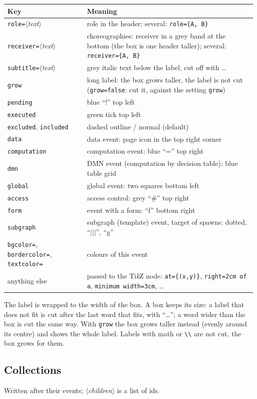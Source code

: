 \documentclass[a4paper,11pt]{article}
\newcommand\cs[1]{\texttt{\textbackslash#1}}
\newcommand\key[1]{\texttt{#1}}
\newcommand\meta[1]{\ensuremath{\langle}\textit{#1}\ensuremath{\rangle}}
\begin{document}
\medskip
\begin{tabularx}{\linewidth}{@{}lL@{}}
\toprule
Key & Meaning\\
\midrule
\key{role=}\meta{text} & role in the header; several: \key{role=\{A, B\}}\\
\key{receiver=}\meta{text} & choreographies: receiver in a grey band at the
  bottom (the box is one header taller); several: \key{receiver=\{A, B\}}\\
\key{subtitle=}\meta{text} & grey italic text below the label, cut off with \dots\\
\key{grow} & long label: the box grows taller, the label is not cut
  (\key{grow=false}: cut it, against the setting \key{grow})\\
\key{pending} & blue ``!'' top left\\
\key{executed} & green tick top left\\
\key{excluded}, \key{included} & dashed outline / normal (default)\\
\key{data} & data event: page icon in the top right corner\\
\key{computation} & computation event: blue ``='' top right\\
\key{dmn} & DMN event (computation by decision table): blue table grid\\
\key{global} & global event: two squares bottom left\\
\key{access} & access control: grey ``\#'' top right\\
\key{form} & event with a form: ``f'' bottom right\\
\key{subgraph} & subgraph (template) event, target of spawns: dotted, ``$|||$'', ``g''\\
\key{bgcolor=}, \key{bordercolor=}, \key{textcolor=} & colours of this event\\
anything else & passed to the Ti\emph{k}Z node: \key{at=\{(x,y)\}},
  \key{right=2cm of a}, \key{minimum width=3cm}, \dots\\
\bottomrule
\end{tabularx}

The label is wrapped to the width of the box. A box keeps its size: a label
that does not fit is cut after the last word that fits, with ``\dots''; a word
wider than the box is cut the same way. With \key{grow} the box grows taller
instead (evenly around its centre) and shows the whole label. Labels with math
or \cs{\textbackslash} are not cut, the box grows for them.

\subsection{Collections}
Written after their events; \meta{children} is a list of ids.
\end{document}
